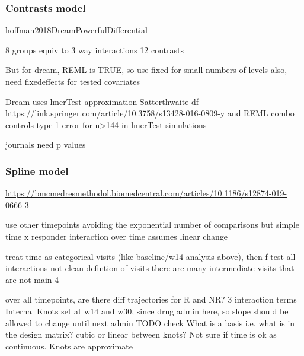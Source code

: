 \begin{outline}
\subsubsection{Contrasts model}

 hoffman2018DreamPowerfulDifferential

8 groups equiv to 3 way interactions
12 contrasts

But for dream, 
REML is TRUE, so use fixed for small numbers of levels
also, need fixedeffects for tested covariates

Dream uses lmerTest approximation Satterthwaite df \url{https://link.springer.com/article/10.3758/s13428-016-0809-y} and REML
combo controls type 1 error for n>144 in lmerTest simulations

journals need p values
%

\subsubsection{Spline model}

\url{https://bmcmedresmethodol.biomedcentral.com/articles/10.1186/s12874-019-0666-3}

use other timepoints avoiding the exponential number of comparisons
but simple time x responder interaction over time assumes linear change

treat time as categorical visits (like baseline/w14 analysis above), then f test all interactions
    not clean defintion of visits
    there are many intermediate visits that are not main 4

over all timepoints, are there diff trajectories for R and NR?
3 interaction terms
Internal Knots set at w14 and w30, since drug admin here, so slope should be allowed to change until next admin
TODO check What is a basis i.e. what is in the design matrix?
cubic or linear between knots?
Not sure if time is ok as continuous. Knots are approximate


\end{outline}

